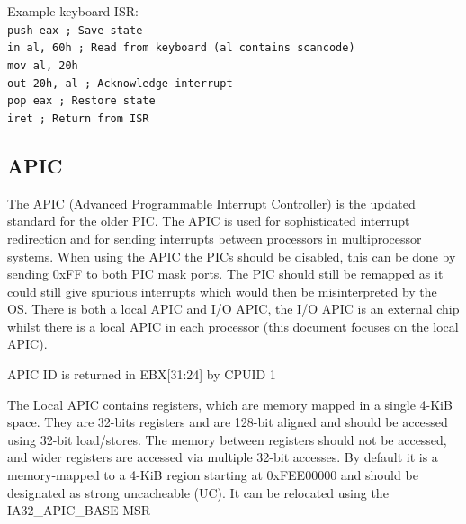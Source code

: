 \documentclass{article}
\newcommand{\layout}[1]{\parbox{\linewidth}{#1}}
\begin{document}
\layout{
  Example keyboard ISR: \\
  \texttt{push eax ; Save state} \\
  \texttt{in al, 60h ; Read from keyboard (al contains scancode)} \\
  \texttt{mov al, 20h} \\
  \texttt{out 20h, al ; Acknowledge interrupt} \\
  \texttt{pop eax ; Restore state} \\
  \texttt{iret ; Return from ISR}

  \bigskip \cite{osdev-int} \cite{osdev-pic}
}

\layout{
  \subsection{APIC}

  The APIC (Advanced Programmable Interrupt Controller) is the updated standard for the older PIC.
  The APIC is used for sophisticated interrupt redirection and for sending interrupts between processors in multiprocessor systems.
  When using the APIC the PICs should be disabled, this can be done by sending 0xFF to both PIC mask ports.
  The PIC should still be remapped as it could still give spurious interrupts which would then be misinterpreted by the OS.
  There is both a local APIC and I/O APIC, the I/O APIC is an external chip whilst there is a local APIC in each processor (this document focuses on the local APIC).
} \bigskip

\layout {
  APIC ID is returned in EBX[31:24] by CPUID 1

  \bigskip \cite[Chapter~12.4.6]{sdm3}
} \bigskip

\layout {
  The Local APIC contains registers, which are memory mapped in a single 4-KiB space.
  They are 32-bits registers and are 128-bit aligned and should be accessed using 32-bit load/stores.
  The memory between registers should not be accessed, and wider registers are accessed via multiple 32-bit accesses.
  By default it is a memory-mapped to a 4-KiB region starting at 0xFEE00000 and should be designated as strong uncacheable (UC).
  It can be relocated using the IA32\_APIC\_BASE MSR
} \bigskip
\end{document}
